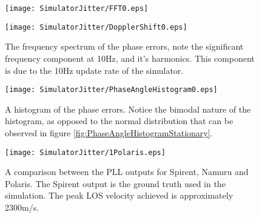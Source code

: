 \begin{figure}[!htb] 
    \centering
    \texttt{[image: SimulatorJitter/FFT0.eps]} 
    \caption{}
    \label{fig:}
\end{figure}


\begin{figure}[!htb] 
    \centering
    \texttt{[image: SimulatorJitter/DopplerShift0.eps]} 
    \caption{The frequency spectrum of the phase errors, note the significant frequency component at 10Hz, and it's harmonics. This component is due to the 10Hz update rate of the simulator.}
    \label{fig:}
\end{figure}


\begin{figure}[!htb] 
    \centering
    \texttt{[image: SimulatorJitter/PhaseAngleHistogram0.eps]} 
    \caption{A histogram of the phase errors. Notice the bimodal nature of the histogram, as opposed to the normal distribution that can be observed in figure \ref{fig:PhaseAngleHistogramStationary}.}
    \label{fig:}
\end{figure}

\begin{figure}[!htb] 
    \centering
    \texttt{[image: SimulatorJitter/1Polaris.eps]} 
    \caption{A comparison between the PLL outputs for Spirent, Namuru and Polaris. The Spirent output is the ground truth used in the simulation. The peak \ac{LOS} velocity achieved is approximately 2300m/s.}
    \label{fig:}
\end{figure}




